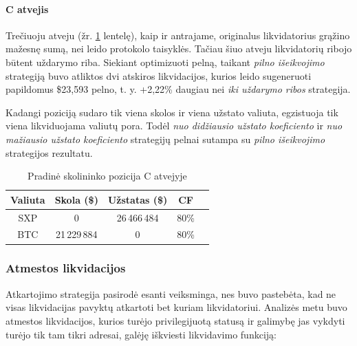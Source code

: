 \documentclass[]{VUMIFTemplateClass}
\begin{document}
\paragraph{C atvejis} Trečiuoju atveju (žr. \ref{case_c} lentelę), kaip ir antrajame, originalus likvidatorius grąžino mažesnę sumą, nei leido protokolo taisyklės. Tačiau šiuo atveju likvidatorių ribojo būtent uždarymo riba. Siekiant optimizuoti pelną, taikant \textit{pilno išeikvojimo} strategiją buvo atliktos dvi atskiros likvidacijos, kurios leido sugeneruoti papildomus \$23,593 pelno, t. y. +2,22\% daugiau nei \textit{iki uždarymo ribos} strategija.

Kadangi poziciją sudaro tik viena skolos ir viena užstato valiuta, egzistuoja tik viena likviduojama valiutų pora. Todėl \textit{nuo didžiausio užstato koeficiento} ir \textit{nuo mažiausio užstato koeficiento} strategijų pelnai sutampa su \textit{pilno išeikvojimo} strategijos rezultatu.

\begin{table}[H]
\centering
\caption{Pradinė skolininko pozicija C atvejyje}
\label{case_c}
\begin{tabular}{|c|c|c|c|c|}
\hline
\textbf{Valiuta} & \textbf{Skola (\$)} & \textbf{Užstatas (\$)} & \textbf{CF} \\ \hline
SXP & 0            &  26\,466\,484 & 80\%  \\ \hline
BTC & 21\,229\,884 &  0            & 80\%  \\ \hline
\end{tabular}
\end{table}

\subsubsection{Atmestos likvidacijos}

Atkartojimo strategija pasirodė esanti veiksminga, nes buvo pastebėta, kad ne visas likvidacijas pavyktų atkartoti bet kuriam likvidatoriui. Analizės metu buvo atmestos likvidacijos, kurios turėjo privilegijuotą statusą ir galimybę jas vykdyti turėjo tik tam tikri adresai, galėję iškviesti likvidavimo funkciją:
\end{document}
